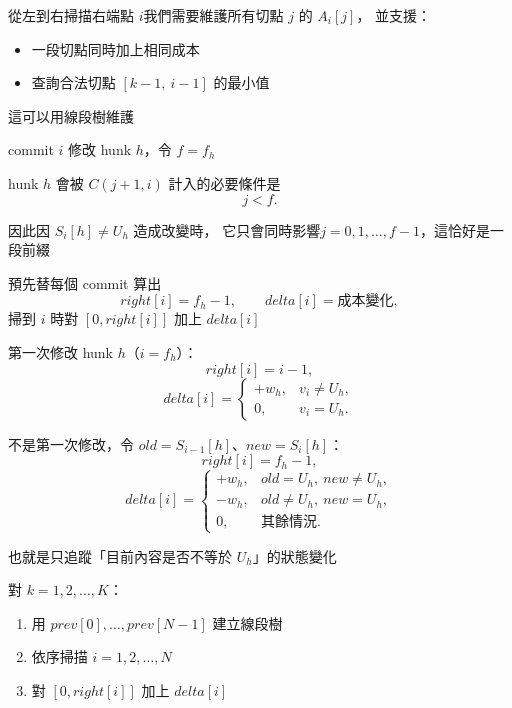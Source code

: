 \begin{frame}{}
    從左到右掃描右端點 $i$我們需要維護所有切點 $j$ 的 $A_i[j]$，
    並支援：
    \begin{itemize}
        \item 一段切點同時加上相同成本
        \item 查詢合法切點 $[k-1,\ i-1]$ 的最小值
    \end{itemize}

    這可以用線段樹維護
\end{frame}

\begin{frame}{}
    commit $i$ 修改 hunk $h$，令 $f=f_h$

    hunk $h$ 會被 $C(j+1,i)$ 計入的必要條件是
    \[
        j<f.
    \]

    因此因 $S_i[h]\neq U_h$ 造成改變時，
    它只會同時影響$j=0,1,\ldots,f-1$，這恰好是一段前綴

    預先替每個 commit 算出
    \[
        right[i]=f_h-1,\qquad delta[i]=\text{成本變化},
    \]
    掃到 $i$ 時對 $[0,right[i]]$ 加上 $delta[i]$
\end{frame}

\begin{frame}{}
    第一次修改 hunk $h$（$i=f_h$）：
    \[
        right[i]=i-1,
    \]
    \[
        delta[i]=
        \begin{cases}
            +w_h,&v_i\neq U_h,\\
            0,&v_i=U_h.
        \end{cases}
    \]
\end{frame}

\begin{frame}{}
    不是第一次修改，令 $old=S_{i-1}[h]$、$new=S_i[h]$：
    \[
        right[i]=f_h-1,
    \]
    \[
        delta[i]=
        \begin{cases}
            +w_h,&old=U_h,\ new\neq U_h,\\
            -w_h,&old\neq U_h,\ new=U_h,\\
            0,&\text{其餘情況}.
        \end{cases}
    \]

    也就是只追蹤「目前內容是否不等於 $U_h$」的狀態變化
\end{frame}

\begin{frame}{}
    對 $k=1,2,\ldots,K$：
    \begin{enumerate}
        \item 用 $prev[0],\ldots,prev[N-1]$ 建立線段樹
        \item 依序掃描 $i=1,2,\ldots,N$
        \item 對 $[0,right[i]]$ 加上 $delta[i]$
    \end{enumerate}
\end{frame}

